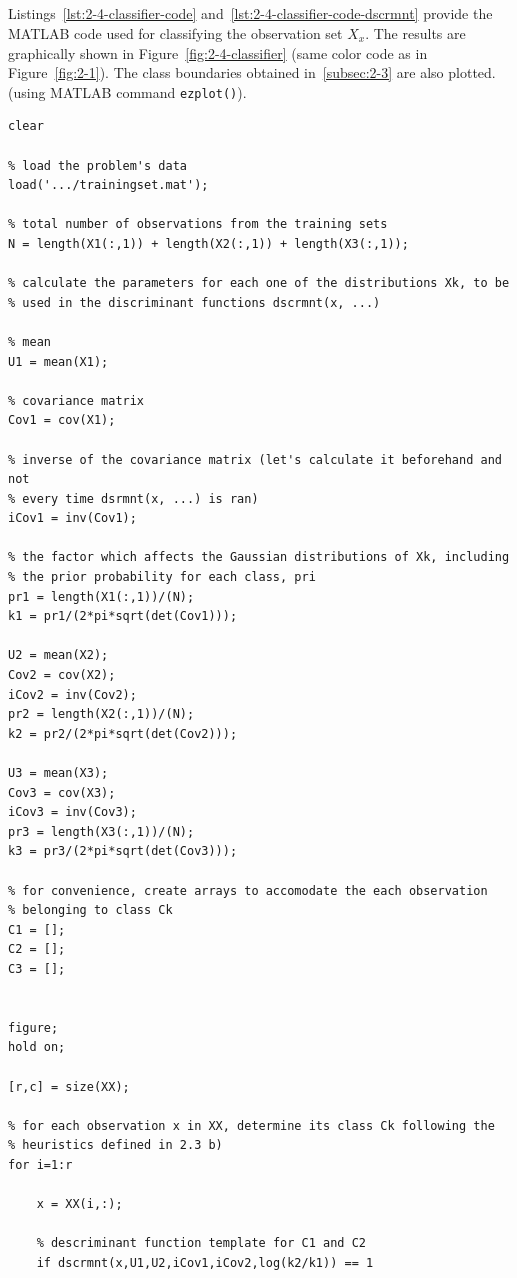 \documentclass[paper=a4, fontsize=11pt]{scrartcl} %
\numberwithin{equation}{section} %
\numberwithin{figure}{section} %
\numberwithin{table}{section} %
\begin{document}
\subsection{}

Listings~\ref{lst:2-4-classifier-code} and~\ref{lst:2-4-classifier-code-dscrmnt} 
provide the MATLAB code used for classifying the observation set $X_x$. The 
results are graphically shown in Figure~\ref{fig:2-4-classifier} (same color 
code as in Figure~\ref{fig:2-1}). The class boundaries obtained 
in~\ref{subsec:2-3} are also plotted. (using MATLAB command \verb=ezplot()=).

\begin{lstlisting}[label=lst:2-4-classifier-code,caption={MATLAB code for 2.4.}]
clear

% load the problem's data
load('.../trainingset.mat');

% total number of observations from the training sets
N = length(X1(:,1)) + length(X2(:,1)) + length(X3(:,1));

% calculate the parameters for each one of the distributions Xk, to be 
% used in the discriminant functions dscrmnt(x, ...)

% mean
U1 = mean(X1);

% covariance matrix
Cov1 = cov(X1);

% inverse of the covariance matrix (let's calculate it beforehand and not 
% every time dsrmnt(x, ...) is ran)
iCov1 = inv(Cov1);

% the factor which affects the Gaussian distributions of Xk, including 
% the prior probability for each class, pri
pr1 = length(X1(:,1))/(N);
k1 = pr1/(2*pi*sqrt(det(Cov1)));

U2 = mean(X2);
Cov2 = cov(X2);
iCov2 = inv(Cov2);
pr2 = length(X2(:,1))/(N);
k2 = pr2/(2*pi*sqrt(det(Cov2)));

U3 = mean(X3);
Cov3 = cov(X3);
iCov3 = inv(Cov3);
pr3 = length(X3(:,1))/(N);
k3 = pr3/(2*pi*sqrt(det(Cov3)));

% for convenience, create arrays to accomodate the each observation 
% belonging to class Ck
C1 = [];
C2 = [];
C3 = [];


figure;
hold on;

[r,c] = size(XX);

% for each observation x in XX, determine its class Ck following the 
% heuristics defined in 2.3 b)
for i=1:r

    x = XX(i,:);
    
    % descriminant function template for C1 and C2
    if dscrmnt(x,U1,U2,iCov1,iCov2,log(k2/k1)) == 1
        

\end{lstlisting}
\end{document}
